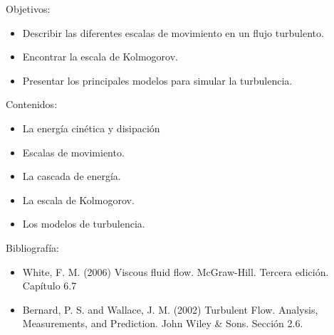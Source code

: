\begin{framed}

Objetivos:
\begin{itemize}
    \item Describir las diferentes escalas de movimiento en un flujo turbulento.
    \item Encontrar la escala de Kolmogorov.
    \item Presentar los principales modelos para simular la turbulencia. 
\end{itemize}

Contenidos:
\begin{itemize}
    \item La energía cinética y disipación
    \item Escalas de movimiento.
    \item La cascada de energía.
    \item La escala de Kolmogorov.
    \item Los modelos de turbulencia.
\end{itemize}

Bibliografía:
\begin{itemize}
    \item White, F. M. (2006) Viscous fluid flow. McGraw-Hill. Tercera edición. Capítulo 6.7
    \item Bernard, P. S. and Wallace, J. M. (2002) Turbulent Flow. Analysis, Measurements, and Prediction. John Wiley \& Sons. Sección 2.6.
\end{itemize}
\end{framed}

